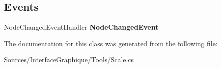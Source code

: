 \subsection*{Events}
\begin{DoxyCompactItemize}
\item 
\hypertarget{class_interface_graphique_1_1_tools_1_1_scale_aee9204f960a68563b18f251f54dbbb5e}{}Node\+Changed\+Event\+Handler {\bfseries Node\+Changed\+Event}\label{class_interface_graphique_1_1_tools_1_1_scale_aee9204f960a68563b18f251f54dbbb5e}

\end{DoxyCompactItemize}


The documentation for this class was generated from the following file\+:\begin{DoxyCompactItemize}
\item 
Sources/\+Interface\+Graphique/\+Tools/Scale.\+cs\end{DoxyCompactItemize}
